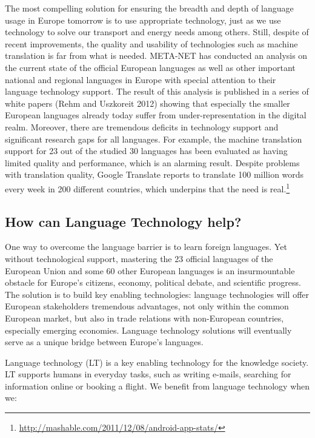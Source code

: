 \begin{multicols}{2}
The most compelling solution for ensuring the breadth and depth of language usage in Europe tomorrow is to use appropriate technology, just as we use technology to solve our transport and energy needs among others. Still, despite of recent improvements, the quality and usability of technologies such as machine translation is far from what is needed. META-NET has conducted an analysis on the current state of the official European languages as well as other important national and regional languages in Europe with special attention to their language technology support. The result of this analysis is published in a series of white papers (Rehm and Uszkoreit 2012) showing that especially the smaller European languages already today suffer from under-representation in the digital realm. Moreover, there are tremendous deficits in technology support and significant research gaps for all languages. For example, the machine translation support for 23 out of the studied 30 languages has been evaluated as having limited quality and performance, which is an alarming result. Despite problems with translation quality, Google Translate reports to translate 100 million words every week in 200 different countries, which underpins that the need is real.\footnote{\url{http://mashable.com/2011/12/08/android-app-stats/}}  

\subsection{How can Language Technology help?}
\label{sec:how-can-language-technology-help}

One way to overcome the language barrier is to learn foreign languages. Yet without technological support, mastering the 23 official languages of the European Union and some 60 other European languages is an insurmountable obstacle for Europe’s citizens, economy, political debate, and scientific progress. The solution is to build key enabling technologies: language technologies will offer European stakeholders tremendous advantages, not only within the common European market, but also in trade relations with non-European countries, especially emerging economies. Language technology solutions will eventually serve as a unique bridge between Europe’s languages. 

Language technology (LT) is a key enabling technology for the knowledge society. LT supports humans in everyday tasks, such as writing e-mails, searching for information online or booking a flight. We benefit from language technology when we:


\end{multicols}
